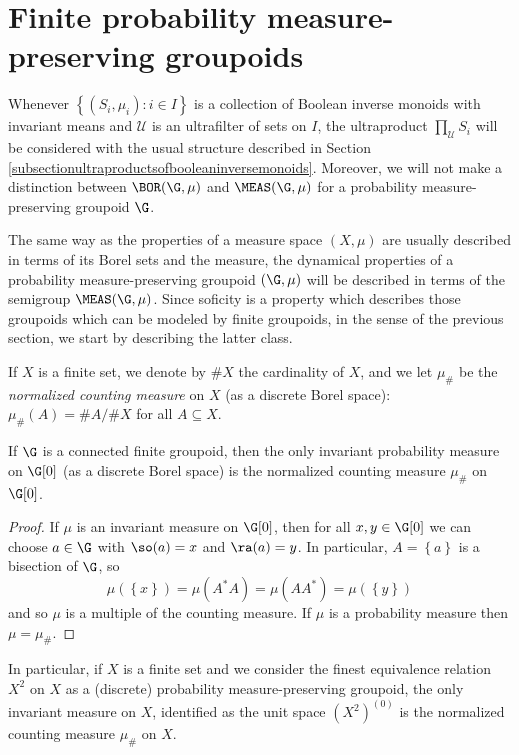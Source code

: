 \section{Finite probability measure-preserving groupoids}

Whenever $\left\{(S_i,\mu_i):i\in I\right\}$ is a collection of Boolean inverse monoids with invariant means and $\mathcal{U}$ is an ultrafilter of sets on $I$, the ultraproduct $\prod_\mathcal{U} S_i$ will be considered with the usual structure described in Section \ref{subsectionultraproductsofbooleaninversemonoids}. Moreover, we will not make a distinction between $\BOR(\G,\mu)$ and $\MEAS(\G,\mu)$ for a probability measure-preserving groupoid $\G$.

The same way as the properties of a measure space $(X,\mu)$ are usually described in terms of its Borel sets and the measure, the dynamical properties of a probability measure-preserving groupoid $(\G,\mu)$ will be described in terms of the semigroup $\MEAS(\G,\mu)$. Since soficity is a property which describes those groupoids which can be modeled by finite groupoids, in the sense of the previous section, we start by describing the latter class.

\begin{definition}
If $X$ is a finite set, we denote by $\# X$ the cardinality of $X$, and we let $\mu_\#$ be the \emph{normalized counting measure} on $X$ (as a discrete Borel space): $\mu_\#(A)=\#A/\#X$ for all $A\subseteq X$.
\end{definition}

\begin{proposition}
If $\G$ is a connected finite groupoid, then the only invariant probability measure on $\G[0]$ (as a discrete Borel space) is the normalized counting measure $\mu_\#$ on $\G[0]$.
\end{proposition}
\begin{proof}
If $\mu$ is an invariant measure on $\G[0]$, then for all $x,y\in\G[0]$ we can choose $a\in\G$ with $\so(a)=x$ and $\ra(a)=y$. In particular, $A=\left\{a\right\}$ is a bisection of $\G$, so
\[\mu(\left\{x\right\})=\mu(A^*A)=\mu(AA^*)=\mu(\left\{y\right\})\]
and so $\mu$ is a multiple of the counting measure. If $\mu$ is a probability measure then $\mu=\mu_\#$.\qedhere
\end{proof}

In particular, if $X$ is a finite set and we consider the finest equivalence relation $X^2$ on $X$ as a (discrete) probability measure-preserving groupoid, the only invariant measure on $X$, identified as the unit space $(X^2)^{(0)}$ is the normalized counting measure $\mu_\#$ on $X$.

